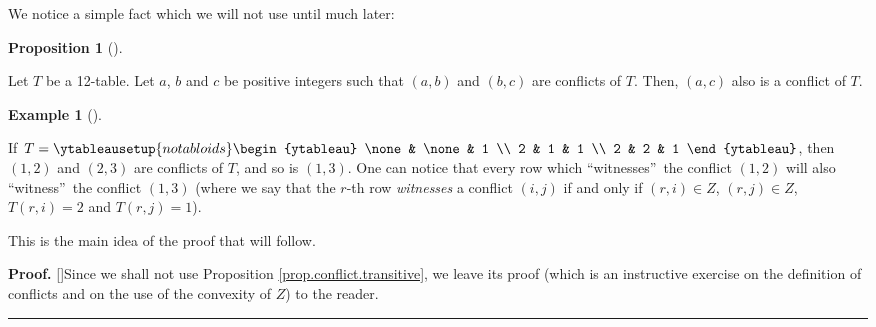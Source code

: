 \documentclass[numbers=enddot,12pt,final,onecolumn,notitlepage]{scrartcl}%
\theoremstyle{definition}
\newtheorem{prop}[theo]{Proposition}
\newenvironment{proposition}[1][]
{\begin{prop}[#1]\begin{leftbar}}
{\end{leftbar}\end{prop}}
\newtheorem{exmp}[theo]{Example}
\newenvironment{example}[1][]
{\begin{exmp}[#1]\begin{leftbar}}
{\end{leftbar}\end{exmp}}
\newenvironment{proof}[1][Proof]{\noindent\textbf{#1.} }{\ \rule{0.5em}{0.5em}}
\newenvironment{verlong}{}{}
\newenvironment{vershort}{}{}
\begin{document}
\begin{verlong}
We notice a simple fact which we will not use until much later:
\end{verlong}

\begin{proposition}
\label{prop.conflict.transitive}Let $T$ be a 12-table. Let $a$, $b$ and $c$ be
positive integers such that $\left(  a,b\right)  $ and $\left(  b,c\right)  $
are conflicts of $T$. Then, $\left(  a,c\right)  $ also is a conflict of $T$.
\end{proposition}

\begin{example}
If $T=%
\ytableausetup{notabloids}
\begin{ytableau}
\none& \none& 1 \\
2 & 1 & 1 \\
2 & 2 & 1
\end{ytableau}%
$, then $\left(  1,2\right)  $ and $\left(  2,3\right)  $ are conflicts of
$T$, and so is $\left(  1,3\right)  $. One can notice that every row which
\textquotedblleft witnesses\textquotedblright\ the conflict $\left(
1,2\right)  $ will also \textquotedblleft witness\textquotedblright\ the
conflict $\left(  1,3\right)  $ (where we say that the $r$-th row
\textit{witnesses} a conflict $\left(  i,j\right)  $ if and only if $\left(
r,i\right)  \in Z$, $\left(  r,j\right)  \in Z$, $T\left(  r,i\right)  =2$ and
$T\left(  r,j\right)  =1$).

\begin{verlong}
This is the main idea of the proof that will follow.
\end{verlong}
\end{example}

\begin{vershort}
\begin{proof}
[\nopunct]Since we shall not use Proposition \ref{prop.conflict.transitive},
we leave its proof (which is an instructive exercise on the definition of
conflicts and on the use of the convexity of $Z$) to the reader.
\end{proof}
\end{vershort}
\end{document}
